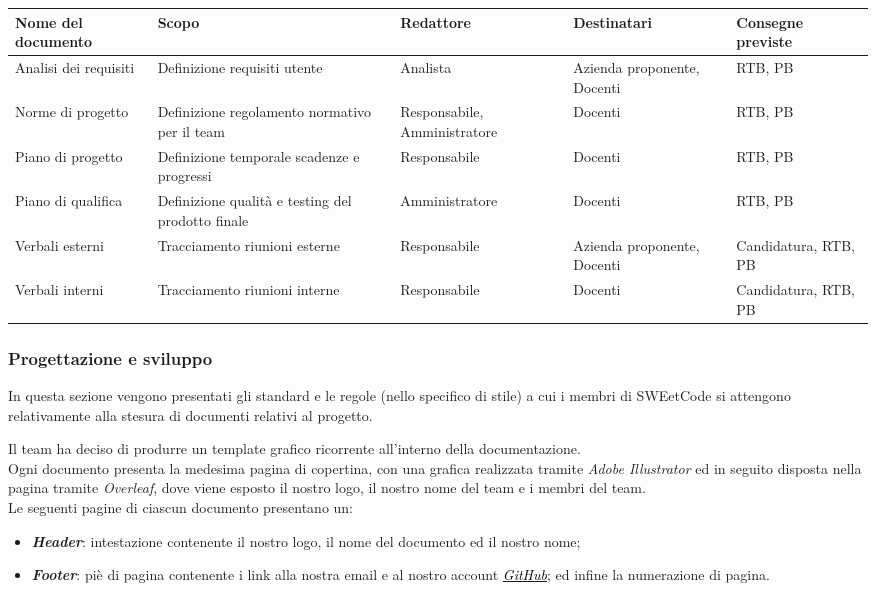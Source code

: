 \documentclass[10pt, a4paper]{article}
\begin{document}
{\renewcommand{\arraystretch}{1.5}
  \begin{xltabular}{\textwidth}{X|X|X|X|X}
    \textbf{Nome del documento} & \textbf{Scopo}  & \textbf{Redattore} &  \textbf{Destinatari} & \textbf{Consegne previste} \\
    
    \hline
    Analisi dei requisiti & Definizione requisiti utente & Analista & Azienda proponente, Docenti & RTB, PB\\
    \hline
    Norme di progetto & Definizione regolamento normativo per il team & Responsabile, Amministratore & Docenti & RTB, PB\\
    \hline
    Piano di progetto & Definizione temporale scadenze e progressi & Responsabile & Docenti & RTB, PB\\
    \hline
    Piano di qualifica & Definizione qualità e testing del prodotto finale & Amministratore & Docenti & RTB, PB\\
    \hline
    Verbali esterni & Tracciamento riunioni esterne & Responsabile & Azienda proponente, Docenti & Candidatura, RTB, PB\\
    \hline
    Verbali interni & Tracciamento riunioni interne & Responsabile & Docenti & Candidatura, RTB, PB\\

\end{xltabular}}

\subsubsection{Progettazione e sviluppo}
In questa sezione vengono presentati gli standard e le regole (nello specifico di stile) a cui i membri di SWEetCode si attengono 
relativamente alla stesura di documenti relativi al progetto. 
    
    Il team ha deciso di produrre un template grafico ricorrente all'interno della documentazione.\\
    Ogni documento presenta la medesima pagina di copertina, con una grafica realizzata tramite \textit{Adobe Illustrator} ed in seguito 
    disposta nella pagina tramite \textit{Overleaf}, dove viene esposto il nostro logo, il nostro nome del team e i membri del team.\\
    Le seguenti pagine di ciascun documento presentano un:
        \begin{itemize}
            \item \textbf{\textit{Header}}: intestazione contenente il nostro logo, il nome del documento ed il nostro nome;
            \item \textbf{\textit{Footer}}: piè di pagina contenente i link alla nostra email e al nostro account \href{https://sweetcode-team.github.io/}{\textcolor{black}{\textit{GitHub}}}; 
            ed infine la numerazione di pagina.
        \end{itemize}
\end{document}
